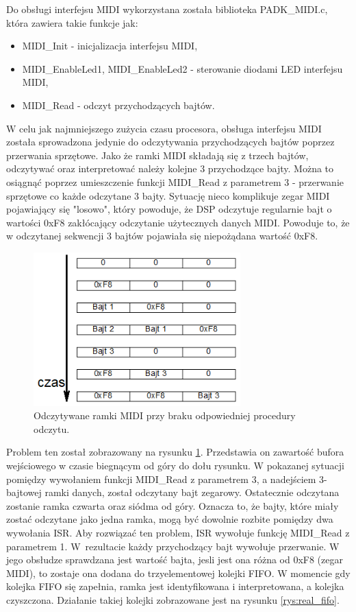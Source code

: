 Do obsługi interfejsu MIDI wykorzystana została biblioteka PADK\_MIDI.c, która zawiera takie funkcje jak:
\begin{itemize}
	\item MIDI\_Init - inicjalizacja interfejsu MIDI,
	\item MIDI\_EnableLed1, MIDI\_EnableLed2 - sterowanie diodami LED interfejsu MIDI,
	\item MIDI\_Read - odczyt przychodzących bajtów. 
\end{itemize}
W celu jak najmniejszego zużycia czasu procesora, obsługa interfejsu MIDI została sprowadzona jedynie do odczytywania przychodzących bajtów poprzez przerwania sprzętowe.
Jako że ramki MIDI składają się z trzech bajtów, odczytywać oraz interpretować należy kolejne 3 przychodzące bajty.
Można to osiągnąć poprzez umieszczenie funkcji MIDI\_Read z parametrem 3 - przerwanie sprzętowe co każde odczytane 3 bajty. Sytuację nieco komplikuje zegar MIDI pojawiający się "losowo", który powoduje, że DSP odczytuje regularnie bajt o wartości 0xF8 zakłócający odczytanie użytecznych danych MIDI. Powoduje to, że w odczytanej sekwencji 3 bajtów pojawiała się niepożądana wartość 0xF8.
\begin{figure}[H]
	\centering
	\includegraphics[width=8cm]{./grafiki/real_nofifo}
	\captionsetup{justification=centering}
	\caption{Odczytywane ramki MIDI przy braku odpowiedniej procedury odczytu.}
	\label{rys:real_nofifo}
\end{figure} 
Problem ten został zobrazowany na rysunku \ref{rys:real_nofifo}. Przedstawia on zawartość bufora wejściowego w czasie biegnącym od góry do dołu rysunku. W pokazanej sytuacji pomiędzy wywołaniem funkcji MIDI\_Read z parametrem 3, a nadejściem 3-bajtowej ramki danych, został odczytany bajt zegarowy. Ostatecznie odczytana zostanie ramka czwarta oraz siódma od góry.  Oznacza to, że bajty, które miały zostać odczytane jako jedna ramka, mogą być dowolnie rozbite pomiędzy dwa wywołania ISR. 
Aby rozwiązać ten problem, ISR wywołuje funkcję MIDI\_Read z parametrem 1. W~rezultacie każdy przychodzący bajt wywołuje przerwanie. W jego obsłudze sprawdzana jest wartość bajta, jesli jest ona różna od 0xF8 (zegar MIDI), to zostaje ona dodana do trzyelementowej kolejki FIFO. W momencie gdy kolejka FIFO się zapełnia, ramka jest identyfikowana i interpretowana, a kolejka czyszczona. Działanie takiej kolejki zobrazowane jest na rysunku \ref{rys:real_fifo}.
